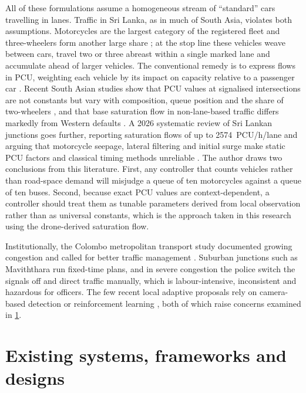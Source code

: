 All of these formulations assume a homogeneous stream of ``standard'' cars travelling in lanes. Traffic in
Sri Lanka, as in much of South Asia, violates both assumptions. Motorcycles are the largest category of the
registered fleet and three-wheelers form another large share \cite{dmt_stats}; at the stop line these vehicles
weave between cars, travel two or three abreast within a single marked lane and accumulate ahead of larger
vehicles. The conventional remedy is to express flows in PCU, weighting each vehicle by its impact on capacity
relative to a passenger car \cite{irc106}. Recent South Asian studies show that PCU values at signalised
intersections are not constants but vary with composition, queue position and the share of two-wheelers
\cite{jatoth2023modeling,perera2025pce}, and that base saturation flow in non-lane-based traffic differs markedly
from Western defaults \cite{sugiarto2024base}. A 2026 systematic review of Sri Lankan junctions goes further,
reporting saturation flows of up to 2574~PCU/h/lane and arguing that motorcycle seepage, lateral filtering and
initial surge make static PCU factors and classical timing methods unreliable \cite{salawavidana2026why}. The author draws two conclusions from this literature. First, any controller that counts vehicles
rather than road-space demand will misjudge a queue of ten motorcycles against a queue of ten buses. Second,
because exact PCU values are context-dependent, a controller should treat them as tunable parameters derived
from local observation rather than as universal constants, which is the approach taken in this research using
the drone-derived saturation flow.

Institutionally, the Colombo metropolitan transport study documented growing congestion and called for better
traffic management \cite{jica2014comtrans}. Suburban junctions such as Maviththara run fixed-time plans, and in
severe congestion the police switch the signals off and direct traffic manually, which is labour-intensive,
inconsistent and hazardous for officers. The few recent local adaptive proposals rely on camera-based detection
\cite{wijesekara2025signals} or reinforcement learning \cite{shangeeth2025emission}, both of which raise
concerns examined in \cref{sec:lit-existing}.

\section{Existing systems, frameworks and designs}\label{sec:lit-existing}
